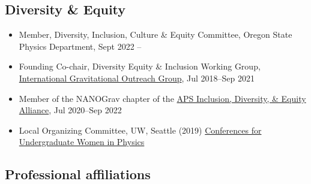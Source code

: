 \documentclass[11pt,letterpaper,sans,unicode]{moderncv}
\begin{document}
\subsection{Diversity \& Equity}
\begin{itemize}[leftmargin=8mm]
\item Member, Diversity, Inclusion, Culture \& Equity Committee, Oregon State Physics Department, Sept 2022 --
\item Founding Co-chair, Diversity Equity \& Inclusion Working Group,  {\color{color1} \href{https://indico.ego-gw.it/event/29/sessions/53/attachments/420/685/International_Gravitational-Wave_Outreach_Group_Meeting__Briefing_Document.pdf}{International Gravitational Outreach Group}}, Jul 2018--Sep 2021
\item Member of the NANOGrav chapter of the {\color{color1} \href{https://www.aps.org/programs/innovation/fund/idea.cfm}{APS Inclusion, Diversity, \& Equity Alliance}}, Jul 2020--Sep 2022
\item Local Organizing Committee, UW, Seattle (2019) {\color{color1} \href{https://www.aps.org/programs/women/cuwip/cuwiphistory.cfm}{Conferences for Undergraduate Women in Physics}}
\end{itemize}

\subsection{Professional affiliations}
%
 \vspace{-0.1cm}

 \vspace{-0.1cm}
 \vspace{-0.1cm}
 \vspace{-0.1cm}
 \vspace{-0.1cm}
\end{document}
